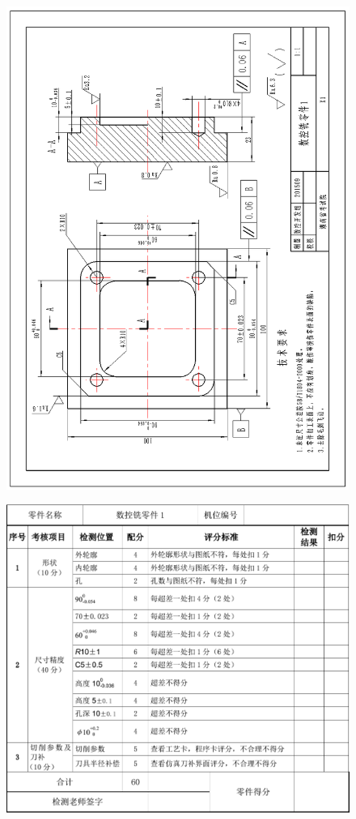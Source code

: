 \begin{figure}
	\centering
	\includegraphics[width=0.9\linewidth]{images/1-1}
	\caption{}
	\label{fig:1-1}
\end{figure}
\begin{figure}
	\centering
	\includegraphics[width=0.9\linewidth]{images/1-2}
	\caption{}
	\label{fig:1-1}
\end{figure}
